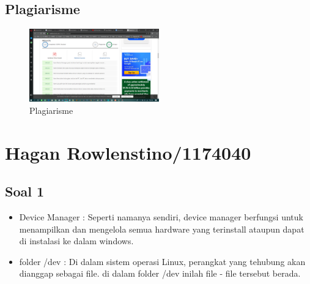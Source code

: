 	\subsection{Plagiarisme}
		\begin{figure}[ht]
            \centerline{\includegraphics[width=0.5\textwidth]{figures/5/1174043/Teori/Plagiarisme.png}}
            \caption{Plagiarisme}
            \label{Plagiarisme}
        \end{figure}


\section{Hagan Rowlenstino/1174040}
	\subsection{Soal 1} 
		\begin{itemize}
			\item Device Manager : Seperti namanya sendiri, device manager berfungsi untuk menampilkan dan mengelola semua hardware yang terinstall ataupun dapat di instalasi ke dalam windows.

			\item folder /dev : Di dalam sistem operasi Linux, perangkat yang tehubung akan dianggap sebagai file. di dalam folder /dev inilah file - file  tersebut berada.
		\end{itemize}

